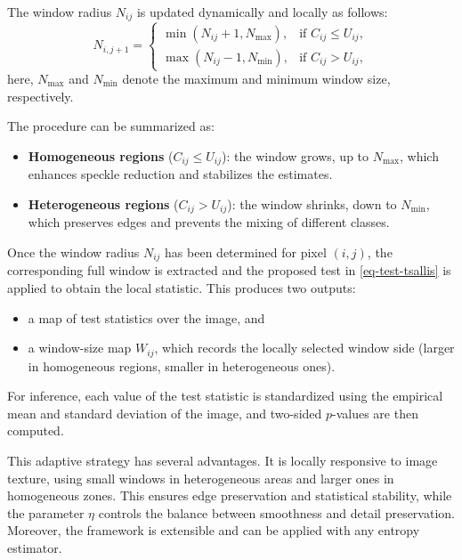 \documentclass[
  lettersize  journal,
]{IEEEtran}%
\providecommand{\tightlist}{%
  \setlength{\itemsep}{0pt}\setlength{\parskip}{0pt}}
\begin{document}
The window radius \(N_{ij}\) is updated dynamically and locally as
follows: \[
N_{i,j+1} =
\begin{cases}
\min(N_{ij} + 1, N_{\max}), & \text{if } C_{ij} \leq U_{ij}, \\
\max(N_{ij} - 1, N_{\min}), & \text{if } C_{ij} > U_{ij},
\end{cases}
\] here, \(N_{\max}\) and \(N_{\min}\) denote the maximum and minimum
window size, respectively.

The procedure can be summarized as:

\begin{itemize}
\tightlist
\item
  \textbf{Homogeneous regions} (\(C_{ij} \leq U_{ij}\)): the window
  grows, up to \(N_{\max}\), which enhances speckle reduction and
  stabilizes the estimates.\\
\item
  \textbf{Heterogeneous regions} (\(C_{ij} > U_{ij}\)): the window
  shrinks, down to \(N_{\min}\), which preserves edges and prevents the
  mixing of different classes.
\end{itemize}

Once the window radius \(N_{ij}\) has been determined for pixel
\((i,j)\), the corresponding full window is extracted and the proposed
test in \eqref{eq-test-tsallis} is applied to obtain the local
statistic. This produces two outputs:

\begin{itemize}
\tightlist
\item
  a map of test statistics over the image, and\\
\item
  a window-size map \(W_{ij}\), which records the locally selected
  window side (larger in homogeneous regions, smaller in heterogeneous
  ones).
\end{itemize}

For inference, each value of the test statistic is standardized using
the empirical mean and standard deviation of the image, and two-sided
\(p\)-values are then computed.

This adaptive strategy has several advantages. It is locally responsive
to image texture, using small windows in heterogeneous areas and larger
ones in homogeneous zones. This ensures edge preservation and
statistical stability, while the parameter \(\eta\) controls the balance
between smoothness and detail preservation. Moreover, the framework is
extensible and can be applied with any entropy estimator.
\end{document}

